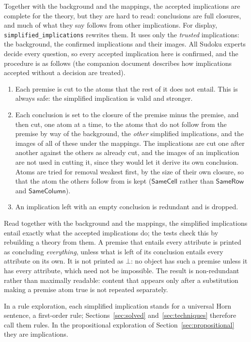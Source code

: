 \documentclass[11pt,a4paper]{article}
\theoremstyle{definition}
\theoremstyle{remark}
\newcommand{\code}[1]{\texttt{#1}}
\newcommand{\pred}[1]{\mathsf{#1}}
\begin{document}
Together with the background and the mappings, the accepted implications are complete for the theory, but they are hard to read: conclusions are full closures, and much of what they say follows from other implications. For display, \code{simplified\_implications} rewrites them. It uses only the \emph{trusted} implications: the background, the confirmed implications and their images. All Sudoku experts decide every question, so every accepted implication here is confirmed, and the procedure is as follows (the companion document describes how implications accepted without a decision are treated).
\begin{enumerate}
  \item Each premise is cut to the atoms that the rest of it does not entail. This is always safe: the simplified implication is valid and stronger.
  \item Each conclusion is set to the closure of the premise minus the premise, and then cut, one atom at a time, to the atoms that do not follow from the premise by way of the background, the \emph{other} simplified implications, and the images of all of these under the mappings. The implications are cut one after another against the others as already cut, and the images of an implication are not used in cutting it, since they would let it derive its own conclusion. Atoms are tried for removal weakest first, by the size of their own closure, so that the atom the others follow from is kept ($\pred{SameCell}$ rather than $\pred{SameRow}$ and $\pred{SameColumn}$).
  \item An implication left with an empty conclusion is redundant and is dropped.
\end{enumerate}
Read together with the background and the mappings, the simplified implications entail exactly what the accepted implications do; the tests check this by rebuilding a theory from them. A premise that entails every attribute is printed as concluding \emph{everything}, unless what is left of its conclusion entails every attribute on its own. It is not printed as $\bot$: no object has such a premise unless it has every attribute, which need not be impossible. The result is non-redundant rather than maximally readable: content that appears only after a substitution making a premise atom true is not repeated separately.

In a rule exploration, each simplified implication stands for a universal Horn sentence, a first-order rule; Sections~\ref{sec:solved} and~\ref{sec:techniques} therefore call them rules. In the propositional exploration of Section~\ref{sec:propositional} they are implications.
\end{document}

